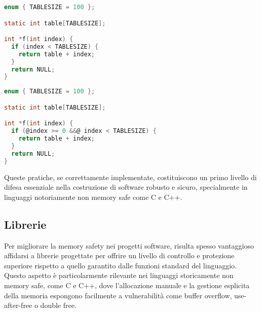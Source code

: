 \begin{minipage}[t]{0.4\textwidth}
  \begin{lstlisting}[language=C, caption={Codice \textit{Non-Compliant}}, label={lst:non-compliant}]
enum { TABLESIZE = 100 };

static int table[TABLESIZE];

int *f(int index) {
  if (index < TABLESIZE) {
    return table + index;
  }
  return NULL;
}
\end{lstlisting}
\end{minipage}
\hfill
\begin{minipage}[t]{0.5\textwidth}
  \begin{lstlisting}[language=C, caption={Codice \textit{Compliant}}, label={lst:compliant}, style=changes_in_c]
enum { TABLESIZE = 100 };

static int table[TABLESIZE];

int *f(int index) {
  if (@index >= 0 &&@ index < TABLESIZE) {
    return table + index;
  }
  return NULL;
}
\end{lstlisting}
\end{minipage}

\medskip
\noindent
Queste pratiche, se correttamente implementate, costituiscono un primo livello di
difesa essenziale nella costruzione di software robusto e sicuro, specialmente
in linguaggi notoriamente non memory safe come C e C++.

\subsection{Librerie}
\label{sec:librerie}

Per migliorare la memory safety nei progetti software, risulta spesso
vantaggioso affidarsi a librerie progettate per offrire un livello di controllo
e protezione superiore rispetto a quello garantito dalle funzioni standard del
linguaggio. Questo aspetto è particolarmente rilevante nei linguaggi storicamente
non memory safe, come C e C++, dove l'allocazione manuale e la gestione esplicita
della memoria espongono facilmente a vulnerabilità come buffer overflow, use-after-free
o double free.

